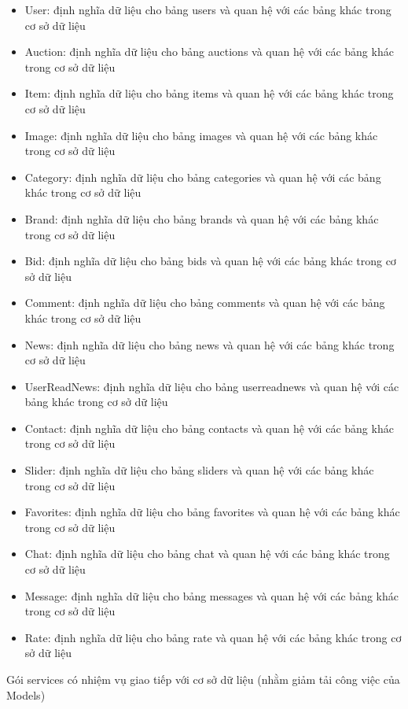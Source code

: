 \documentclass{article}
\begin{document}
\begin{itemize}
    \item User: định nghĩa dữ liệu cho bảng users và quan hệ với các bảng khác trong cơ sở dữ liệu
    \item Auction: định nghĩa dữ liệu cho bảng auctions và quan hệ với các bảng khác trong cơ sở dữ liệu
    \item Item: định nghĩa dữ liệu cho bảng items và quan hệ với các bảng khác trong cơ sở dữ liệu
    \item Image: định nghĩa dữ liệu cho bảng images và quan hệ với các bảng khác trong cơ sở dữ liệu
    \item Category: định nghĩa dữ liệu cho bảng categories và quan hệ với các bảng khác trong cơ sở dữ liệu
    \item Brand: định nghĩa dữ liệu cho bảng brands và quan hệ với các bảng khác trong cơ sở dữ liệu
    \item Bid: định nghĩa dữ liệu cho bảng bids và quan hệ với các bảng khác trong cơ sở dữ liệu
    \item Comment: định nghĩa dữ liệu cho bảng comments và quan hệ với các bảng khác trong cơ sở dữ liệu
    \item News: định nghĩa dữ liệu cho bảng news và quan hệ với các bảng khác trong cơ sở dữ liệu
    \item UserReadNews: định nghĩa dữ liệu cho bảng userreadnews và quan hệ với các bảng khác trong cơ sở dữ liệu
    \item Contact: định nghĩa dữ liệu cho bảng contacts và quan hệ với các bảng khác trong cơ sở dữ liệu
    \item Slider: định nghĩa dữ liệu cho bảng sliders và quan hệ với các bảng khác trong cơ sở dữ liệu
    \item Favorites: định nghĩa dữ liệu cho bảng favorites và quan hệ với các bảng khác trong cơ sở dữ liệu
    \item Chat: định nghĩa dữ liệu cho bảng chat và quan hệ với các bảng khác trong cơ sở dữ liệu
    \item Message: định nghĩa dữ liệu cho bảng messages và quan hệ với các bảng khác trong cơ sở dữ liệu
    \item Rate: định nghĩa dữ liệu cho bảng rate và quan hệ với các bảng khác trong cơ sở dữ liệu
\end{itemize}
Gói services có nhiệm vụ giao tiếp với cơ sở dữ liệu (nhằm giảm tải công việc của Models)
\end{document}
